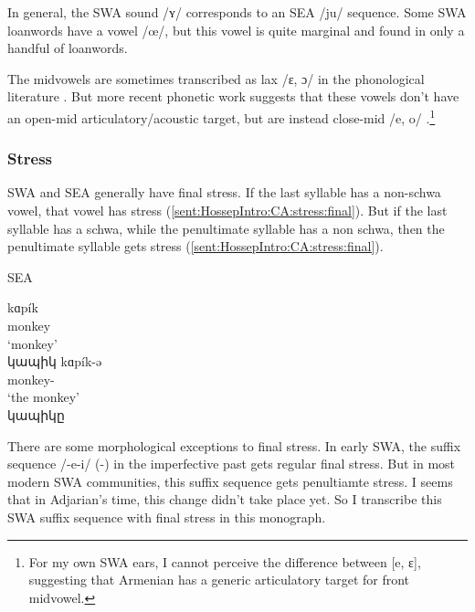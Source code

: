 In general, the SWA sound /ʏ/ corresponds to an SEA /ju/ sequence. Some SWA loanwords have a vowel /œ/, but this vowel is quite marginal and found in only a handful of loanwords. 

The midvowels are sometimes transcribed as lax /ɛ, ɔ/ in the phonological literature \citep{Vaux-1998-ArmenianPhono}. But more recent phonetic work suggests that these vowels don't have an open-mid articulatory/acoustic target, but are instead close-mid /e, o/ \citep{Toparlak-2019-MAArmenianPhonetics,Seyfarth-JIPAArmenian}.\footnote{For my own SWA ears, I cannot perceive the difference between [e, ɛ], suggesting that Armenian has a generic articulatory target for front midvowel.}
	
\subsubsection{Stress}\label{sec:HossepIntro:phonotransc:modern:stress}




SWA and SEA generally have final stress. If the last syllable has a non-schwa vowel, that vowel has stress (\ref{sent:HossepIntro:CA:stress:final}). But if the last syllable has a schwa, while the penultimate syllable has a non schwa, then the penultimate syllable gets stress (\ref{sent:HossepIntro:CA:stress:final}). 

\begin{exe}
	\ex SEA \label{sent:HossepIntro:CA:stress}
	\begin{xlist}
		\ex \gll kɑp\'ik \\
		monkey \\
		\trans `monkey' \label{sent:HossepIntro:CA:stress:final}\\
		կապիկ
		\ex \gll kɑp\'ik-ə \\
		monkey-{} \\
		\trans `the monkey' \label{sent:HossepIntro:CA:stress:penult} \\
		կապիկը
		
	\end{xlist}
\end{exe}

There are some morphological exceptions to final stress. In early SWA, the suffix sequence /-e-i/ ({\thgloss}-{\pst}) in the imperfective past gets regular final stress. But in  most modern SWA communities, this suffix sequence gets penultiamte stress. I seems that in Adjarian's time, this change didn't take place yet. So I transcribe this SWA suffix sequence with final stress in this monograph. 

